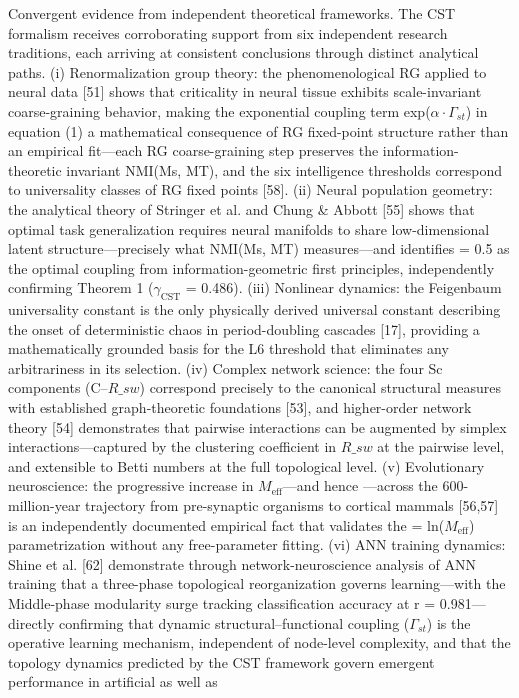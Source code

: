 \documentclass[a4paper,12pt]{article}
\begin{document}
Convergent evidence from independent theoretical frameworks.
The CST formalism receives corroborating support from six independent research traditions, each arriving at consistent conclusions through distinct analytical paths. (i) Renormalization group theory: the phenomenological RG applied to neural data [51] shows that criticality in neural tissue exhibits scale-invariant coarse-graining behavior, making the exponential coupling term
exp($\alpha \cdot \Gamma_{st}$) in equation (1) a mathematical consequence of RG fixed-point structure rather than an empirical fit---each RG coarse-graining step preserves the information-theoretic invariant NMI(Ms, MT), and the six intelligence thresholds correspond to universality classes of RG fixed points [58]. (ii) Neural population geometry: the analytical theory of Stringer et al. and
Chung \& Abbott [55] shows that optimal task generalization requires neural manifolds to share low-dimensional latent structure---precisely what NMI(Ms, MT) measures---and identifies  \gamma  = 0.5 as the optimal coupling from information-geometric first principles, independently confirming Theorem 1 ($\gamma_{\text{CST}}$ = 0.486). (iii) Nonlinear dynamics: the Feigenbaum universality constant  \delta 
  is the only physically derived universal constant describing the onset of deterministic chaos in period-doubling cascades [17], providing a mathematically grounded basis for the L6 threshold that eliminates any arbitrariness in its selection. (iv) Complex network science: the four Sc components (C--$R\_{sw}$) correspond precisely to the canonical structural measures with
established graph-theoretic foundations [53], and higher-order network theory [54] demonstrates that pairwise interactions can be augmented by simplex interactions---captured by the clustering coefficient in $R\_{sw}$ at the pairwise level, and extensible to Betti numbers at the full topological level. (v) Evolutionary neuroscience: the progressive increase in $M_{\text{eff}}$---and hence
 \alpha ---across the 600-million-year trajectory from pre-synaptic organisms to cortical mammals [56,57] is an independently documented empirical fact that validates the  \alpha  = ln($M_{\text{eff}}$) parametrization without any free-parameter fitting. (vi) ANN training dynamics: Shine et al. [62] demonstrate through network-neuroscience analysis of ANN training that a three-phase topological
reorganization governs learning---with the Middle-phase modularity surge tracking classification accuracy at r = 0.981---directly confirming that dynamic structural--functional coupling ($\Gamma_{st}$) is the operative learning mechanism, independent of node-level complexity, and that the topology dynamics predicted by the CST framework govern emergent performance in artificial as well as
\end{document}
